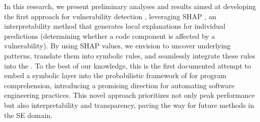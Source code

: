 
In this research, we present preliminary analyses and results aimed at developing the first \framework approach for vulnerability detection \cite{zhou2019devign}, leveraging SHAP \cite{NIPS2017_Lundberg}, an interpretability method that generates local explanations for individual predictions (\eg determining whether a code component is affected by a vulnerability). By using SHAP values, we envision to uncover underlying patterns, translate them into symbolic rules, and seamlessly integrate these rules into the \lcm. To the best of our knowledge, this is the first documented attempt to embed a symbolic layer into the probabilistic framework of \lcms for program comprehension, introducing a promising direction for automating software engineering practices. This novel approach prioritizes not only peak performance but also interpretability and transparency, paving the way for future methods in the SE domain.



